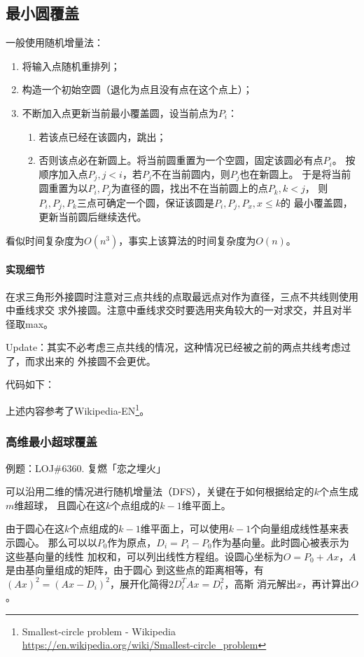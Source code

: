 \subsection{最小圆覆盖}
一般使用随机增量法：
\begin{enumerate}
	\item 将输入点随机重排列；
	\item 构造一个初始空圆（退化为点且没有点在这个点上）；
	\item 不断加入点更新当前最小覆盖圆，设当前点为$P_i$：
	\begin{enumerate}
		\item 若该点已经在该圆内，跳出；
		\item 否则该点必在新圆上。将当前圆重置为一个空圆，固定该圆必有点$P_i$。
		按顺序加入点$P_j,j<i$，若$P_j$不在当前圆内，则$P_j$也在新圆上。
		于是将当前圆重置为以$P_i,P_j$为直径的圆，找出不在当前圆上的点$P_k,k<j$，
		则$P_i,P_j,P_k$三点可确定一个圆，保证该圆是$P_i,P_j,P_x,x\leq k$的
		最小覆盖圆，更新当前圆后继续迭代。
	\end{enumerate}
\end{enumerate}

看似时间复杂度为$O(n^3)$，事实上该算法的时间复杂度为$O(n)$。

\paragraph{实现细节}
在求三角形外接圆时注意对三点共线的点取最远点对作为直径，三点不共线则使用中垂线求交
求外接圆。注意中垂线求交时要选用夹角较大的一对求交，并且对半径取max。

Update：其实不必考虑三点共线的情况，这种情况已经被之前的两点共线考虑过了，而求出来的
外接圆不会更优。

代码如下：


上述内容参考了Wikipedia-EN\footnote{
	Smallest-circle problem - Wikipedia\\
	\url{https://en.wikipedia.org/wiki/Smallest-circle\_problem}
}。
\subsubsection{高维最小超球覆盖}
例题：LOJ\#6360. 复燃「恋之埋火」

可以沿用二维的情况进行随机增量法（DFS），关键在于如何根据给定的$k$个点生成$m$维超球，
且圆心在这$k$个点组成的$k-1$维平面上。

由于圆心在这$k$个点组成的$k-1$维平面上，可以使用$k-1$个向量组成线性基来表示圆心。
那么可以以$P_0$作为原点，$D_i=P_i-P_0$作为基向量。此时圆心被表示为这些基向量的线性
加权和，可以列出线性方程组。设圆心坐标为$O=P_0+Ax$，$A$是由基向量组成的矩阵，由于圆心
到这些点的距离相等，有$(Ax)^2=(Ax-D_i)^2$，展开化简得$2D_i^TAx=D_i^2$，高斯
消元解出$x$，再计算出$O$。

